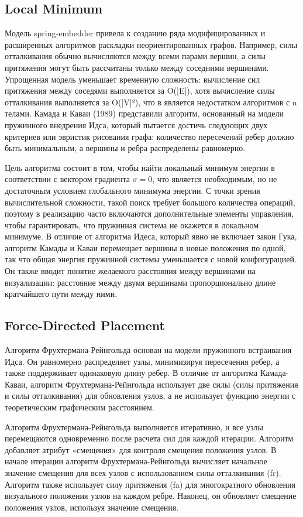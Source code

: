 \subsection{Local Minimum}
Модель spring-embedder привела к созданию ряда модифицированных и расширенных алгоритмов раскладки неориентированных графов. 
Например, силы отталкивания обычно вычисляются между всеми парами вершин, а силы притяжения могут быть рассчитаны только между 
соседними вершинами. Упрощенная модель уменьшает временную сложность: вычисление сил притяжения между соседями выполняется за O(|E|), 
хотя вычисление силы отталкивания выполняется за O(|V|²), что в является недостатком алгоритмов с n телами. Камада и Каваи (1989) представили 
алгоритм, основанный на модели пружинного внедрения Идса, который пытается достичь следующих двух критериев или эвристик рисования графа: 
количество пересечений ребер должно быть минимальным, а вершины и ребра распределены равномерно. 

Цель алгоритма состоит в том, чтобы найти локальный минимум энергии в соответствии с вектором градиента $\sigma = 0$, что является необходимым, 
но не достаточным условием глобального минимума энергии. С точки зрения вычислительной сложности, такой поиск требует большого количества 
операций, поэтому в реализацию часто включаются дополнительные элементы управления, чтобы гарантировать, что пружинная система не 
окажется в локальном минимуме. В отличие от алгоритма Идеса, который явно не включает закон Гука, алгоритм Камады и Каваи перемещает 
вершины в новые положения по одной, так что общая энергия пружинной системы уменьшается с новой конфигурацией. Он также вводит понятие желаемого 
расстояния между вершинами на визуализации: расстояние между двумя вершинами пропорционально длине кратчайшего пути между ними.

\subsection{Force-Directed Placement}
Алгоритм Фрухтермана-Рейнгольда основан на модели пружинного встраивания Идса. Он равномерно распределяет узлы, минимизируя пересечения ребер, 
а также поддерживает одинаковую длину ребер. В отличие от алгоритма Камада-Каваи, алгоритм Фрухтермана-Рейнгольда использует две 
силы (силы притяжения и силы отталкивания) для обновления узлов, а не использует функцию энергии с теоретическим графическим расстоянием.

Алгоритм Фрухтермана-Рейнгольда выполняется итеративно, и все узлы перемещаются одновременно после расчета сил для каждой итерации. 
Алгоритм добавляет атрибут «смещения» для контроля смещения положения узлов. В начале итерации алгоритм Фрухтермана-Рейнгольда вычисляет 
начальное значение смещения для всех узлов с использованием силы отталкивания (fr). Алгоритм также использует силу притяжения (fa) для 
многократного обновления визуального положения узлов на каждом ребре. Наконец, он обновляет смещение положения узлов, используя значение смещения.

